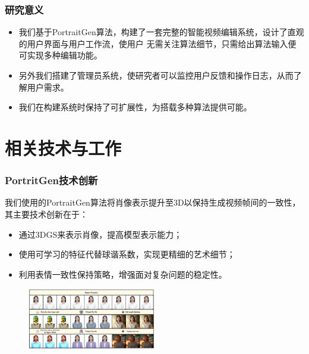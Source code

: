 \documentclass[aspectratio=169]{ctexbeamer}
\begin{document}
\begin{frame}
  \frametitle{研究意义}
  \begin{itemize}
    \item 我们基于PortraitGen算法，构建了一套完整的智能视频编辑系统，设计了直观的用户界面与用户工作流，使用户
    无需关注算法细节，只需给出算法输入便可实现多种编辑功能。
    \item 另外我们搭建了管理员系统，使研究者可以监控用户反馈和操作日志，从而了解用户需求。
    \item 我们在构建系统时保持了可扩展性，为搭载多种算法提供可能。
  \end{itemize}

\end{frame}

\section{相关技术与工作}

\begin{frame}
  \frametitle{PortritGen技术创新}
  我们使用的PortraitGen算法将肖像表示提升至3D以保持生成视频帧间的一致性，其主要技术创新在于：
  \begin{itemize}
    \item 通过3DGS来表示肖像，提高模型表示能力；
    \item 使用可学习的特征代替球谐系数，实现更精细的艺术细节；
    \item 利用表情一致性保持策略，增强面对复杂问题的稳定性。
  \end{itemize}
  \begin{figure}
    \includegraphics[width=0.5\textwidth]{source/portraitgen.png}
  \end{figure}
\end{frame}
\end{document}
